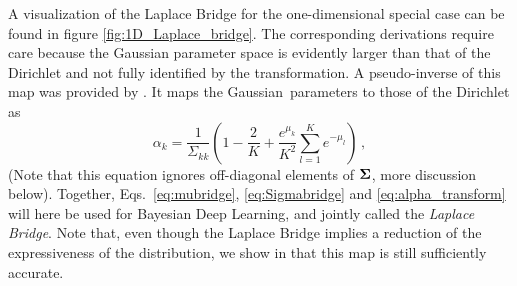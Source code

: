 A visualization of the Laplace Bridge for the one-dimensional special case can be found in figure \ref{fig:1D_Laplace_bridge}.
The corresponding derivations require care because the Gaussian parameter space is evidently larger than that of the Dirichlet and not fully identified by the transformation.
A pseudo-inverse of this map was provided by \citet{KernelTopicModels2012}. It maps the Gaussian parameters to those of the Dirichlet as
\begin{equation} \label{eq:alpha_transform}
    \alpha_k = \frac{1}{\Sigma_{kk}}\left(1 - \frac{2}{K} + \frac{e^{\mu_k}}{K^2}\sum_{l=1}^K e^{-\mu_l} \right) \, ,
\end{equation}
(Note that this equation ignores off-diagonal elements of ${\boldsymbol{\Sigma}}$, more discussion below). Together, Eqs.~\ref{eq:mubridge}, \ref{eq:Sigmabridge} and \ref{eq:alpha_transform} will here be used for Bayesian Deep Learning, and jointly called the \emph{Laplace Bridge}. Note that, even though the Laplace Bridge implies a reduction of the expressiveness of the distribution, we show in  that this map is still sufficiently accurate.


